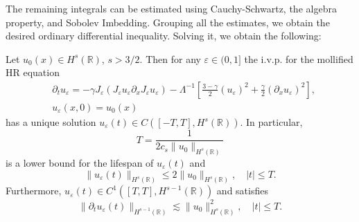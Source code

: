 \documentclass{beamer}
\newcommand{\rr}{\mathbb{R}}
\newcommand{\p}{\partial}
\newcommand{\ee}{\varepsilon}
\begin{document}
\begin{frame}
%
The remaining integrals can be estimated using Cauchy-Schwartz, the algebra
property, and Sobolev Imbedding. Grouping all the estimates, we obtain the
desired ordinary differential inequality. Solving  it, we obtain the following:
%
%
\end{frame}
%
%
%
\begin{frame}
%
%
\begin{lemma}
\label{hr_wp}
Let  $u_0(x) \in  H^s(\rr)$, $s >3/2$. Then for any $\ee\in (0, 1]$
the i.v.p. for the mollified HR equation 
%
%
%
\begin{align*} 
& \partial_t  u_\ee =
-\gamma J_\ee (J_\ee u_\ee \partial_x  J_\ee  u_\ee) - \Lambda^{-1} \left
[\frac{3-\gamma}{2}(u_\ee)^2 + \frac{\gamma}{2}(\p_x u_\ee)^2
\right ], 
\\
&  u_\ee(x, 0) = u_0 (x)
\label{burgers-moli-data-2}
\end{align*}
%
% 
%
%
%
%
%
%
has a unique solution $u_\ee( t)\in C([-T, T], H^s(\rr))$.  In particular,
%
%
%
\begin{equation*} \label{life-est}
T
=
\frac{1}{ 2 c_s \|u_0\|_{H^s(\rr)}}
\end{equation*}
%
%
%
is a lower bound for the lifespan of $u_\ee( t)$ and
%
%
%
\begin{equation*}
\label{u-e-Hs-bound}
\|u_\ee(t)\|_{H^s(\rr)}
\le
2 \|u_0 \|_{H^s(\rr)},
\quad
|t| \le T.
\end{equation*}
%
%
%
Furthermore,  $u_\ee( t)\in C^1([T, T], H^{s-1}(\rr))$ and satisfies
%
%
\begin{equation*}
\label{dt-u-e-Hs-bound}
\|\p_t u_\ee(t)\|_{H^{s-1}(\rr)}
\lesssim
\|u_0 \|_{H^s(\rr)}^2,
\quad
|t| \le T.
\end{equation*}
%
%
% 
\end{lemma}
%
%
\end{frame}
%
%
\end{document}
